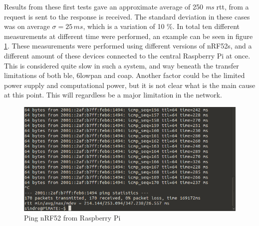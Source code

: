 



\noindent Results from these first tests gave an approximate average of 250 \textit{ms} \gls{rtt}, from a request is sent to the response is received. The standard deviation in these cases was on average $ \sigma = 25 \, ms $, which is a variation of 10 \%. In total ten different measurements at different time were performed, an example can be seen in figure \ref{fig:ping3}. These measurements were performed using different versions of \glspl{nRF52}, and a different amount of these devices connected to the central Raspberry Pi at once. This is considered quite slow in such a system, and way beneath the transfer limitations of both \gls{ble}, \gls{6lowpan} and \gls{coap}. Another factor could be the limited power supply and computational power, but it is not clear what is the main cause at this point. This will regardless be a major limitation in the network.

\begin{figure}[ht]
    \centering
    \includegraphics[width=1.0\textwidth]{ping4.png}    
    \caption{Ping nRF52 from Raspberry Pi}
    \label{fig:ping3}
\end{figure}


